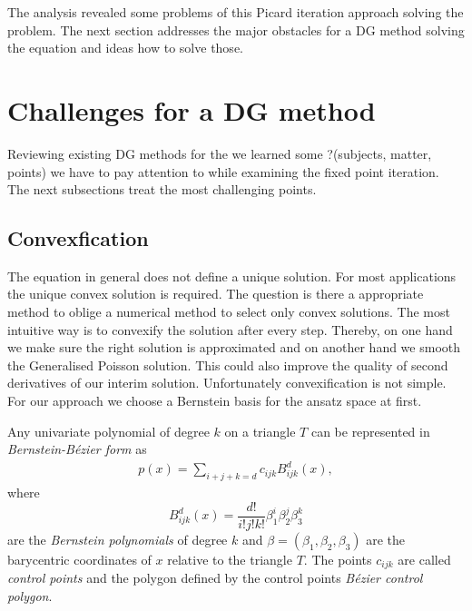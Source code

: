 

The analysis revealed some problems of this Picard iteration approach solving the \MA problem. The next section addresses the major obstacles for a DG method solving the \MA equation and ideas how to solve those.
\section{Challenges for a \MA DG method}
Reviewing existing DG methods for the \MA we learned some ?(subjects, matter, points) we have to pay attention to  while examining the fixed point iteration. The next subsections treat the most challenging points.

\subsection{Convexfication} \label{subsec: convexification}
 The \MA equation in general does not define a unique solution. For most applications the unique convex solution is required. The question is there a appropriate method to oblige a numerical method to select only convex solutions.
The most intuitive way is to convexify the solution after every step. Thereby, on one hand we make sure the right solution is approximated and on another hand we smooth the Generalised Poisson solution. This could also improve the quality of second derivatives of our interim solution. %
Unfortunately convexification is not simple. For our approach we choose a Bernstein basis for the ansatz space at first.
\begin{definition}\label{def: BernsteinBezierForm}
	Any univariate polynomial of degree $k$ on a triangle $T$ can be represented in \emph{Bernstein-B\'ezier form} as
\begin{align}
	p(x) = \sum_{i+j+k = d}  c_{ijk} B^d_{ijk}(x),\label{eq: BernsteinBezierForm}
\end{align}
where
\[
	B^d_{ijk}(x) = \frac {d!}{i!j!k!} \beta_1^i \beta_2^j \beta_3^k
\]
are the \emph{Bernstein polynomials} of degree $k$ and $\beta = (\beta_1, \beta_2, \beta_3)$ are the barycentric coordinates of $x$ relative to the triangle $T$.
The points $c_{ijk}$ are called \emph{control points} and the polygon defined by the control points \emph{B\'ezier control polygon}.
\end{definition}


